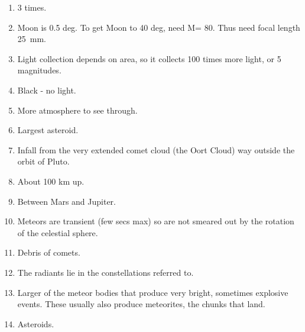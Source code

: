 \documentclass[11pt]{article}
\begin{document}
\begin{enumerate}
\item 
3 times.

\item 
Moon is 0.5 deg. To get Moon to 40 deg, need M= 80.
Thus need focal length 25~mm.

\item 
Light collection depends on area, so it collects 100 times more light,
or 5 magnitudes.


\item 
Black - no light.

\item 
More atmosphere to see through.



\item 
Largest asteroid.

\item 
Infall from the very extended comet cloud (the Oort Cloud) way outside
the orbit of Pluto.


\item 
About 100 km up.


\item 
Between Mars and Jupiter.


\item 
Meteors are transient (few secs max) so are not smeared out by the
rotation of the celestial sphere.


\item 
Debris of comets.

\item
The radiants lie in the constellations referred to.

\item 
Larger of the meteor bodies that produce very bright, sometimes
explosive events. These usually also produce meteorites, the chunks
that land.

\item 
Asteroids.


\end{enumerate} 
\end{document}
